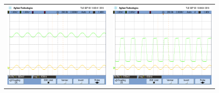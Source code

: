 \begin{figure}[H]
    \centering
    \begin{tabular}{c c}
        \includegraphics[scale=0.2]{../EJ5/Mediciones/Osciloscopio/Senoide_440_Medio/scope_5.png} &
        \includegraphics[scale=0.2]{../EJ5/Mediciones/Osciloscopio/Senoide_440_Medio/scope_6.png} \\

\end{tabular}
\end{figure}
